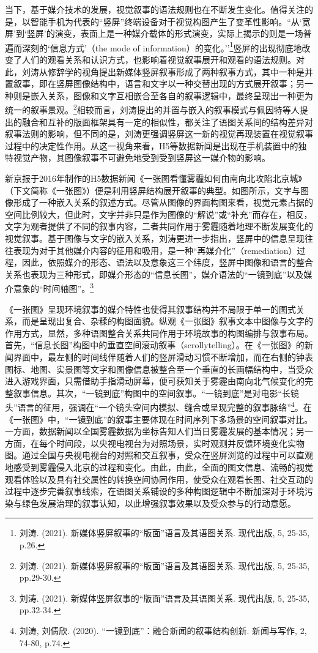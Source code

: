 当下，基于媒介技术的发展，视觉叙事的语法规则也在不断发生变化。值得关注的是，以智能手机为代表的``竖屏''终端设备对于视觉构图产生了变革性影响。``从`宽屏'到`竖屏'的演变，表面上是一种媒介载体的形式演变，实际上揭示的则是一场普遍而深刻的`信息方式'（the
mode of
information）的变化。''\footnote{刘涛. (2021).
  新媒体竖屏叙事的``版面''语言及其语图关系. 现代出版, 5, 25-35, p.26.}竖屏的出现彻底地改变了人们的观看关系和认识方式，也影响着视觉叙事展开和观看的语法规则。对此，刘涛从修辞学的视角提出新媒体竖屏叙事形成了两种叙事方式，其中一种是并置叙事，即在竖屏图像结构中，语言和文字以一种交替出现的方式展开叙事；另一种则是嵌入关系，图像和文字互相嵌合至各自的叙事逻辑中，最终呈现出一种更为统一的叙事景观。\footnote{刘涛.
  (2021). 新媒体竖屏叙事的``版面''语言及其语图关系. 现代出版, 5, 25-35,
  pp.29-30.}相较而言，刘涛提出的并置与嵌入的叙事模式与佩因特等人提出的融合和互补的版面框架具有一定的相似性，都关注了语图关系间的结构差异对叙事法则的影响，但不同的是，刘涛更强调竖屏这一新的视觉再现装置在视觉叙事过程中的决定性作用。从这一视角来看，H5等数据新闻是出现在手机装置中的独特视觉产物，其图像叙事不可避免地受到受到竖屏这一媒介物的影响。

新京报于2016年制作的H5数据新闻《一张图看懂雾霾如何由南向北攻陷北京城》（下文简称《一张图》）便是利用竖屏结构展开叙事的典型。如图所示，文字与图像形成了一种嵌入关系的叙述方式。尽管从图像的界面构图来看，视觉元素占据的空间比例较大，但此时，文字并非只是作为图像的``解说''或``补充''而存在，相反，文字为观者提供了不同的叙事内容，二者共同作用于雾霾随着地理不断发展变化的视觉叙事。基于图像与文字的嵌入关系，刘涛更进一步指出，竖屏中的信息呈现往往表现为对于其他媒介内容的征用和吸用，是一种``再媒介化''（remediation）过程，因此，依照媒介的形态、语法以及意象这三个纬度，竖屏中图像和语言的整合关系也表现为三种形式，即媒介形态的``信息长图''，媒介语法的``一镜到底''以及媒介意象的``时间轴图''。\footnote{刘涛.
  (2021). 新媒体竖屏叙事的``版面''语言及其语图关系. 现代出版, 5, 25-35,
  pp.32-34.}

《一张图》呈现环境叙事的媒介特性也使得其叙事结构并不局限于单一的图式关系，而是呈现出复合、杂糅的构图面貌。纵观《一张图》叙事文本中图像与文字的作用方式，显然，多种语图整合关系共同作用于环境故事的构图编排与叙事布局。首先，``信息长图''构图中的垂直空间滚动叙事（scrollytelling）。在《一张图》的新闻界面中，最左侧的时间线伴随着人们的竖屏滑动习惯不断增加，而在右侧的钟表图标、地图、实景图等文字和图像信息被整合至一个垂直的长画幅结构中，当受众进入游戏界面，只需借助手指滑动屏幕，便可获知关于雾霾由南向北气候变化的完整叙事信息。其次，``一镜到底''构图中的空间叙事。``一镜到底''是对电影``长镜头''语言的征用，强调在``一个镜头空间内模拟、缝合或呈现完整的叙事脉络''\footnote{刘涛,
  刘倩欣. (2020). ``一镜到底''：融合新闻的叙事结构创新. 新闻与写作, 2,
  74-80, p.74.}。在《一张图》中，``一镜到底''的叙事主要体现在时间序列下多场景的空间叙事对比。一方面，数据新闻以全国雾霾数据为坐标告知人们当日雾霾发展的基本情况；另一方面，在每个时间段，以央视电视台为对照场景，实时观测并反馈环境变化实物图。通过全国与央视电视台的对照和交互叙事，受众在竖屏浏览的过程中可以直观地感受到雾霾侵入北京的过程和变化。由此，由此，全面的图文信息、流畅的视觉观看体验以及具有社交属性的转换空间协同作用，使受众在观看长图、社交互动的过程中逐步完善叙事线索，在语图关系铺设的多种构图逻辑中不断加深对于环境污染与绿色发展治理的叙事认知，以此增强叙事效果以及受众参与的行动意愿。

